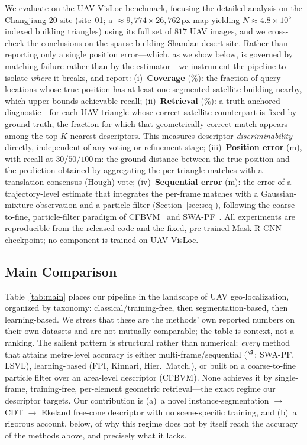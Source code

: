 \documentclass[10pt]{article}
\theoremstyle{plain}
\theoremstyle{definition}
\begin{document}
We evaluate on the UAV-VisLoc benchmark, focusing the detailed analysis on the
Changjiang-20 site (site~01; a ${\approx}9{,}774\times26{,}762$\,px map yielding
$N\!\approx\!4.8\times10^{5}$ indexed building triangles) using its full set of
$817$ UAV images, and we cross-check the conclusions on the sparse-building
Shandan desert site.
Rather than reporting only a single position error---which, as we show below, is
governed by matching failure rather than by the estimator---we instrument the
pipeline to isolate \emph{where} it breaks, and report:
(i)~\textbf{Coverage} (\%): the fraction of query locations whose true position
has at least one segmented satellite building nearby, which upper-bounds
achievable recall;
(ii)~\textbf{Retrieval} (\%): a truth-anchored diagnostic---for each UAV triangle
whose correct satellite counterpart is fixed by ground truth, the fraction for
which that geometrically correct match appears among the top-$K$ nearest
descriptors. This measures descriptor \emph{discriminability} directly,
independent of any voting or refinement stage;
(iii)~\textbf{Position error} (m), with recall at $30/50/100$\,m: the ground
distance between the true position and the prediction obtained by aggregating
the per-triangle matches with a translation-consensus (Hough) vote;
(iv)~\textbf{Sequential error} (m): the error of a trajectory-level estimate that
integrates the per-frame matches with a Gaussian-mixture observation and a
particle filter (Section~\ref{sec:seq}), following the coarse-to-fine,
particle-filter paradigm of CFBVM~\cite{ouyang2024cfbvm} and
SWA-PF~\cite{yuan2025swapf}.
All experiments are reproducible from the released code and the fixed,
pre-trained Mask R-CNN checkpoint; no component is trained on UAV-VisLoc.

\subsection{Main Comparison}
\label{sec:main_comp}

Table~\ref{tab:main} places our pipeline in the landscape of UAV
geo-localization, organized by taxonomy: classical/training-free, then
segmentation-based, then learning-based.
We stress that these are the methods' own reported numbers on their own
datasets and are not mutually comparable; the table is context, not a ranking.
The salient pattern is structural rather than numerical: \emph{every} method
that attains metre-level accuracy is either multi-frame/sequential ($^\S$;
SWA-PF, LSVL), learning-based (FPI, Kinnari, Hier.\ Match.), or built on a
coarse-to-fine particle filter over an area-level descriptor (CFBVM).
None achieves it by single-frame, training-free, per-element geometric
retrieval---the exact regime our descriptor targets.
Our contribution is (a)~a novel instance-segmentation $\to$ CDT $\to$ Ekeland
free-cone descriptor with no scene-specific training, and (b)~a rigorous account,
below, of why this regime does not by itself reach the accuracy of the methods
above, and precisely what it lacks.
\end{document}
